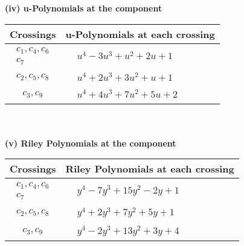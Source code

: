\documentclass[1p]{elsarticle_modified}
\theoremstyle{definition}
\begin{document}
\newpage\renewcommand{\arraystretch}{1}
\flushleft \textbf{(iv) u-Polynomials at the component}\newline \\
\begin{tabular}{m{50pt}|m{274pt}}
Crossings & \hspace{64pt}u-Polynomials at each crossing \\
\hline $$\begin{aligned}c_{1},c_{4},c_{6}\\c_{7}\end{aligned}$$&$\begin{aligned}
&u^4-3 u^3+u^2+2 u+1
\end{aligned}$\\
\hline $$\begin{aligned}c_{2},c_{5},c_{8}\end{aligned}$$&$\begin{aligned}
&u^4+2 u^3+3 u^2+u+1
\end{aligned}$\\
\hline $$\begin{aligned}c_{3},c_{9}\end{aligned}$$&$\begin{aligned}
&u^4+4 u^3+7 u^2+5 u+2
\end{aligned}$\\
\hline
\end{tabular}\\~\\
\newpage\renewcommand{\arraystretch}{1}
\flushleft \textbf{(v) Riley Polynomials at the component}\newline \\
\begin{tabular}{m{50pt}|m{274pt}}
Crossings & \hspace{64pt}Riley Polynomials at each crossing \\
\hline $$\begin{aligned}c_{1},c_{4},c_{6}\\c_{7}\end{aligned}$$&$\begin{aligned}
&y^4-7 y^3+15 y^2-2 y+1
\end{aligned}$\\
\hline $$\begin{aligned}c_{2},c_{5},c_{8}\end{aligned}$$&$\begin{aligned}
&y^4+2 y^3+7 y^2+5 y+1
\end{aligned}$\\
\hline $$\begin{aligned}c_{3},c_{9}\end{aligned}$$&$\begin{aligned}
&y^4-2 y^3+13 y^2+3 y+4
\end{aligned}$\\
\hline
\end{tabular}\\~\\
\end{document}
